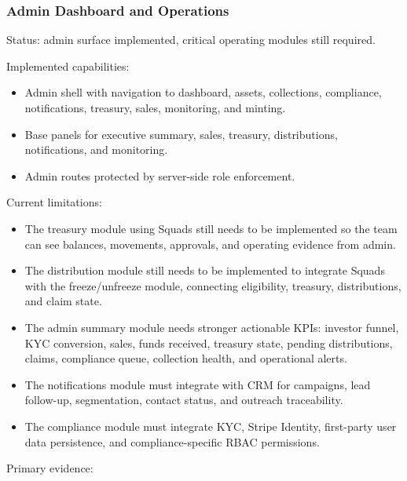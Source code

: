 \documentclass[
  10pt,
  letterpaper,
]{article}
\providecommand{\tightlist}{%
  \setlength{\itemsep}{0pt}\setlength{\parskip}{0pt}}
\begin{document}
\subsubsection{Admin Dashboard and
Operations}\label{admin-dashboard-and-operations}

Status: admin surface implemented, critical operating modules still
required.

Implemented capabilities:

\begin{itemize}
\tightlist
\item
  Admin shell with navigation to dashboard, assets, collections,
  compliance, notifications, treasury, sales, monitoring, and minting.
\item
  Base panels for executive summary, sales, treasury, distributions,
  notifications, and monitoring.
\item
  Admin routes protected by server-side role enforcement.
\end{itemize}

Current limitations:

\begin{itemize}
\tightlist
\item
  The treasury module using Squads still needs to be implemented so the
  team can see balances, movements, approvals, and operating evidence
  from admin.
\item
  The distribution module still needs to be implemented to integrate
  Squads with the freeze/unfreeze module, connecting eligibility,
  treasury, distributions, and claim state.
\item
  The admin summary module needs stronger actionable KPIs: investor
  funnel, KYC conversion, sales, funds received, treasury state, pending
  distributions, claims, compliance queue, collection health, and
  operational alerts.
\item
  The notifications module must integrate with CRM for campaigns, lead
  follow-up, segmentation, contact status, and outreach traceability.
\item
  The compliance module must integrate KYC, Stripe Identity, first-party
  user data persistence, and compliance-specific RBAC permissions.
\end{itemize}

Primary evidence:
\end{document}
